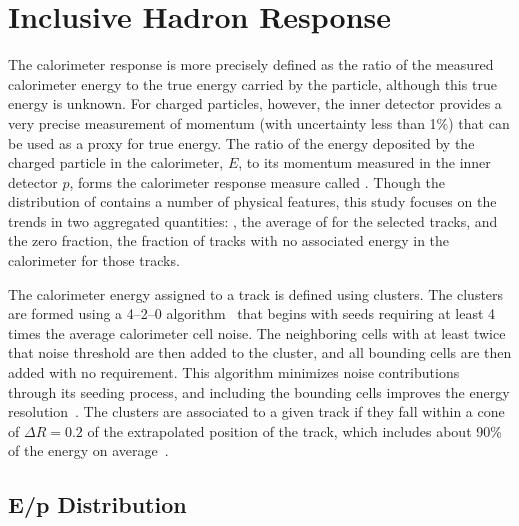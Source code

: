 \section{Inclusive Hadron Response}
\label{sec:inclusive}

The calorimeter response is more precisely defined as the ratio of the measured calorimeter energy to the true energy carried by the particle, although this true energy is unknown. 
For charged particles, however, the inner detector provides a very precise measurement of momentum (with uncertainty less than 1\%) that can be used as a proxy for true energy.
The ratio of the energy deposited by the charged particle in the calorimeter, $E$, to its momentum measured in the inner detector $p$, forms the calorimeter response measure called \ep.
Though the distribution of \ep contains a number of physical features, this study focuses on the trends in two aggregated quantities: \epav, the average of \ep for the selected tracks, and the zero fraction, the fraction of tracks with no associated energy in the calorimeter for those tracks.

The calorimeter energy assigned to a track is defined using clusters. 
The clusters are formed using a 4--2--0 algorithm~\cite{TopoClusters} that begins with seeds requiring at least 4 times the average calorimeter cell noise. 
The neighboring cells with at least twice that noise threshold are then added to the cluster, and all bounding cells are then added with no requirement. 
This algorithm minimizes noise contributions through its seeding process, and including the bounding cells improves the energy resolution~\cite{Speckmayer}.
The clusters are associated to a given track if they fall within a cone of $\Delta R = 0.2$ of the extrapolated position of the track, which includes about 90\% of the energy on average~\cite{PERF-2011-05}.

\subsection{E/p Distribution}


